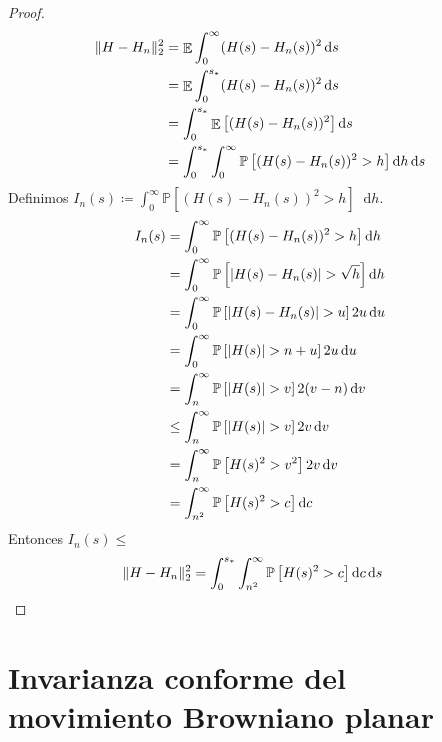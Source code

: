\documentclass{article}
\newcommand{\prob}{\mathbb{P}}
\newcommand{\dd}{\mathop{}\!\mathrm{d}}
\DeclareMathOperator{\Expectation}{\mathbb{E}}
\DeclarePairedDelimiter{\abs}{\lvert}{\rvert}
\DeclarePairedDelimiter{\norm}{\|}{\|}
\theoremstyle{plain}
\theoremstyle{remark}
\theoremstyle{definition}
\begin{document}
\begin{proof}
  \begin{align}
    \norm{H - H_n}_2^2
    &=
    \Expectation \int_0^{\infty} (H(s) - H_n(s))^2 \dd s
    \\
    &=
    \Expectation \int_0^{s_*} (H(s) - H_n(s))^2 \dd s
    \\
    &=
    \int_0^{s_*} \Expectation \left[ (H(s) - H_n(s))^2 \right] \dd s
    \\
    &=
    \int_0^{s_*} \int_0^{\infty} \prob \left[ (H(s) - H_n(s))^2 > h \right] \dd h \dd s
  \end{align}
  Definimos \(I_n(s) \coloneqq \int_0^{\infty} \prob \left[ (H(s) - H_n(s))^2 > h \right] \dd h\).
  \begin{align}
    I_n(s)
    &=
    \int_0^{\infty} \prob \left[ (H(s) - H_n(s))^2 > h \right] \dd h
    \\
    &=
    \int_0^{\infty} \prob \left[ \abs{H(s) - H_n(s)} > \sqrt{h} \right] \dd h
    \\
    &=
    \int_0^{\infty} \prob \left[ \abs{H(s) - H_n(s)} > u \right] 2 u \dd u
    \\
    &=
    \int_0^{\infty} \prob \left[ \abs{H(s)} > n + u \right] 2 u \dd u
    \\
    &=
    \int_n^{\infty} \prob \left[ \abs{H(s)} > v \right] 2 (v - n) \dd v
    \\
    &\leq
    \int_n^{\infty} \prob \left[ \abs{H(s)} > v \right] 2 v \dd v
    \\
    &=
    \int_n^{\infty} \prob \left[ H(s)^2 > v^2 \right] 2 v \dd v
    \\
    &=
    \int_{n^2}^{\infty} \prob \left[ H(s)^2 > c \right] \dd c
  \end{align}
  Entonces \(I_n(s) \leq \)
  \begin{align}
    \norm{H - H_n}_2^2
    &=
    \int_0^{s_*} 
      \int_{n^2}^{\infty} 
        \prob \left[ H(s)^2 > c \right] 
      \dd c 
    \dd s
  \end{align}
  
\end{proof}


\part{Invarianza conforme del movimiento Browniano planar}
\end{document}
